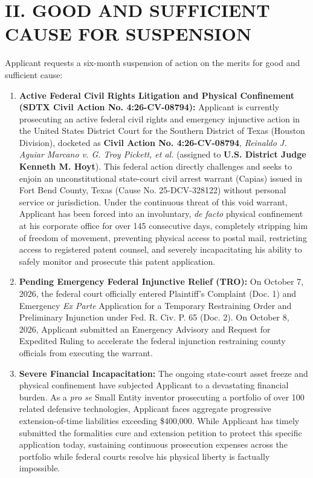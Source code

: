 \documentclass[11pt,letterpaper]{article}
\begin{document}
\section*{II. GOOD AND SUFFICIENT CAUSE FOR SUSPENSION}

Applicant requests a six-month suspension of action on the merits for good and sufficient cause:

\begin{enumerate}[leftmargin=2em, itemsep=3pt, parsep=0pt]
    \item \textbf{Active Federal Civil Rights Litigation and Physical Confinement (SDTX Civil Action No. 4:26-CV-08794):} Applicant is currently prosecuting an active federal civil rights and emergency injunctive action in the United States District Court for the Southern District of Texas (Houston Division), docketed as \textbf{Civil Action No. 4:26-CV-08794}, \textit{Reinaldo J. Aguiar Marcano v. G. Troy Pickett, et al.} (assigned to \textbf{U.S. District Judge Kenneth M. Hoyt}). This federal action directly challenges and seeks to enjoin an unconstitutional state-court civil arrest warrant (Capias) issued in Fort Bend County, Texas (Cause No. 25-DCV-328122) without personal service or jurisdiction. Under the continuous threat of this void warrant, Applicant has been forced into an involuntary, \textit{de facto} physical confinement at his corporate office for over 145 consecutive days, completely stripping him of freedom of movement, preventing physical access to postal mail, restricting access to registered patent counsel, and severely incapacitating his ability to safely monitor and prosecute this patent application.
    \item \textbf{Pending Emergency Federal Injunctive Relief (TRO):} On October 7, 2026, the federal court officially entered Plaintiff's Complaint (Doc. 1) and Emergency \textit{Ex Parte} Application for a Temporary Restraining Order and Preliminary Injunction under Fed. R. Civ. P. 65 (Doc. 2). On October 8, 2026, Applicant submitted an Emergency Advisory and Request for Expedited Ruling to accelerate the federal injunction restraining county officials from executing the warrant.
    \item \textbf{Severe Financial Incapacitation:} The ongoing state-court asset freeze and physical confinement have subjected Applicant to a devastating financial burden. As a \textit{pro se} Small Entity inventor prosecuting a portfolio of over 100 related defensive technologies, Applicant faces aggregate progressive extension-of-time liabilities exceeding \$400,000. While Applicant has timely submitted the formalities cure and extension petition to protect this specific application today, sustaining continuous prosecution expenses across the portfolio while federal courts resolve his physical liberty is factually impossible.
\end{enumerate}
\end{document}
